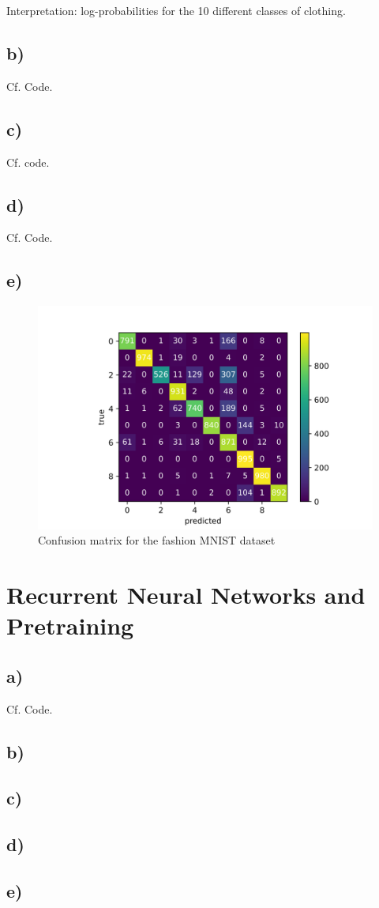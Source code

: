 \documentclass[11pt]{article}
\begin{document}
Interpretation: log-probabilities for the 10 different classes of clothing.

\subsection{b)}\label{subsec:cnn-b}
Cf. Code.

\subsection{c)}\label{subsec:cnn-c}
Cf. code.
\subsection{d)}\label{subsec:cnn-d}
Cf. Code.
\subsection{e)}\label{subsec:cnn-e}

\begin{figure}[hbt]
  	\center
  	\includegraphics[width=\columnwidth]{assets/conf_mat}
  	\caption{Confusion matrix for the fashion MNIST dataset}
  	\label{fig:f-mnist-conf-mat}
\end{figure}
	


\newpage

\section{Recurrent Neural Networks and Pretraining}\label{sec:rnn}
\subsection{a)}\label{subsec:rnn-a}
Cf. Code.
\subsection{b)}\label{subsec:rnn-b}

\subsection{c)}\label{subsec:rnn-c}

\subsection{d)}\label{subsec:rnn-d}

\subsection{e)}\label{subsec:rnn-e}




\end{document}
